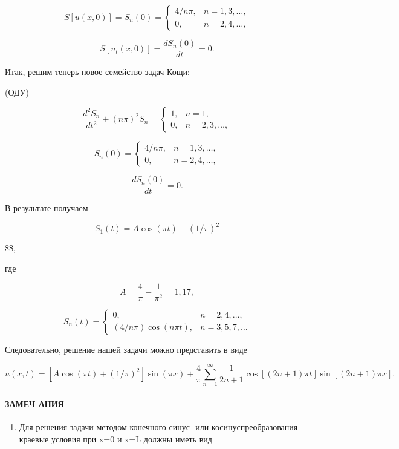 \documentclass[
  ukrainian,
]{article}
\providecommand{\tightlist}{%
  \setlength{\itemsep}{0pt}\setlength{\parskip}{0pt}}
\begin{document}
\[
S[u(x, 0)] = S_n(0) = \begin{cases} 4/n\pi, & n = 1, 3, \dots, \\ 0, &n = 2, 4, \dots, \end{cases}
\]

\[
S[u_t(x, 0)] = \frac{dS_n(0)}{dt} = 0.
\]

Итак, решим теперь новое семейство задач Кощи:

(ОДУ)

\[
\frac{d^2S_n}{dt^2} + (n\pi)^2 S_n = \begin{cases} 1, &n = 1, \\ 0, &n = 2, 3, \dots, \end{cases}
\]

\[
S_n(0) = \begin{cases}
4/n\pi, & n = 1, 3, \dots, \\
0, & n = 2, 4, \dots,
\end{cases}
\]

\[
\frac{dS_n(0)}{dt} = 0.
\]

В результате получаем

\[
S_1(t) = A\cos(\pi t) + (1/\pi)^2
\]

\$\$,

где

\[
A = \frac{4}{\pi} - \frac{1}{\pi^2} = 1,17,
\]

\[
S_n(t) = \begin{cases} 0, &n = 2, 4, \dots, \\ (4/n\pi)\cos(n\pi t), &n = 3, 5, 7, \dots \end{cases}
\]

Следовательно, решение нашей задачи можно представить в виде

\[
u(x, t) = [A\cos(\pi t) + (1/\pi)^2] \sin(\pi x) + \frac{4}{\pi} \sum_{n=1}^{\infty} \frac{1}{2n+1} \cos[(2n+1)\pi t] \sin[(2n+1)\pi x].
\]

\paragraph{ЗАМЕЧ
АНИЯ}\label{ux437ux430ux43cux435ux447-ux430ux43dux438ux44f}

\begin{enumerate}
\def\labelenumi{\arabic{enumi}.}
\tightlist
\item
  Для решения задачи методом конечного синус- или косинуспреобразования
  краевые условия при x=0 и x=L должны иметь вид
\end{enumerate}
\end{document}
